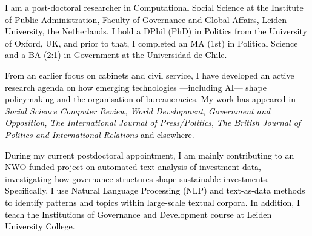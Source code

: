




\vspace{3mm}

\begin{cvparagraph}

\textcolor{black}{I am a post-doctoral researcher in Computational Social Science at the Institute of Public Administration, Faculty of Governance and Global Affairs, Leiden University, the Netherlands. I hold a DPhil (PhD) in Politics from the University of Oxford, UK, and prior to that, I completed an MA (1st) in Political Science and a BA (2:1) in Government at the Universidad de Chile.}

\textcolor{black}{From an earlier focus on cabinets and civil service, I have developed an active research agenda on how emerging technologies ---including AI--- shape policymaking and the organisation of bureaucracies. My work has appeared in {\itshape Social Science Computer Review}, {\itshape World Development}, {\itshape Government and Opposition}, {\itshape The International Journal of Press/Politics}, {\itshape The British Journal of Politics and International Relations} and elsewhere.}

\textcolor{black}{During my current postdoctoral appointment, I am mainly contributing to an NWO-funded project on automated text analysis of investment data, investigating how governance structures shape sustainable investments. Specifically, I use Natural Language Processing (NLP) and text-as-data methods to identify patterns and topics within large-scale textual corpora. In addition, I teach the Institutions of Governance and Development course at Leiden University College.}
\vspace{1mm}
\end{cvparagraph}
